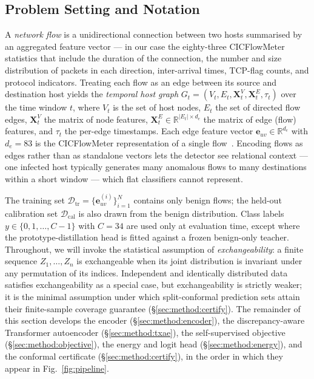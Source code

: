 \documentclass[journal,twoside]{IEEEtran}
\begin{document}
\subsection{Problem Setting and Notation}
\label{sec:method:setting}
A \emph{network flow} is a unidirectional connection between two hosts
summarised by an aggregated feature vector --- in our case the
eighty-three CICFlowMeter statistics that include the duration of the
connection, the number and size distribution of packets in each direction,
inter-arrival times, TCP-flag counts, and protocol indicators. Treating
each flow as an edge between its source and destination host yields the
\emph{temporal host graph}
$G_t = (V_t, E_t, \mathbf{X}_t^V, \mathbf{X}_t^E, \tau_t)$ over the time
window $t$, where $V_t$ is the set of host nodes, $E_t$ the set of
directed flow edges, $\mathbf{X}_t^V$ the matrix of node features,
$\mathbf{X}_t^E \in \mathbb{R}^{|E_t|\times d_e}$ the matrix of edge
(flow) features, and $\tau_t$ the per-edge timestamps. Each edge feature
vector $\mathbf{e}_{uv} \in \mathbb{R}^{d_e}$ with $d_e = 83$ is the
CICFlowMeter representation of a single flow~\cite{sharafaldin2018cicids}.
Encoding flows as edges rather than as standalone vectors lets the
detector see relational context --- one infected host typically generates
many anomalous flows to many destinations within a short window --- which
flat classifiers cannot represent.

The training set
$\mathcal{D}_\text{tr} = \{\mathbf{e}_{uv}^{(i)}\}_{i=1}^N$ contains only
benign flows; the held-out calibration set $\mathcal{D}_\text{cal}$ is
also drawn from the benign distribution. Class labels
$y \in \{0, 1, \dots, C-1\}$ with $C = 34$ are used only at evaluation
time, except where the prototype-distillation head is fitted against a
frozen benign-only teacher. Throughout, we will invoke the
statistical assumption of \emph{exchangeability}: a finite sequence
$Z_1, \dots, Z_n$ is exchangeable when its joint distribution is invariant
under any permutation of its indices. Independent and identically
distributed data satisfies exchangeability as a special case, but
exchangeability is strictly weaker; it is the minimal assumption under
which split-conformal prediction sets attain their finite-sample coverage
guarantee (\S\ref{sec:method:certify}). The remainder of this section
develops the encoder (\S\ref{sec:method:encoder}), the discrepancy-aware
Transformer autoencoder (\S\ref{sec:method:txae}), the self-supervised
objective (\S\ref{sec:method:objective}), the energy and logit head
(\S\ref{sec:method:energy}), and the conformal certificate
(\S\ref{sec:method:certify}), in the order in which they appear in
Fig.~\ref{fig:pipeline}.
\end{document}

